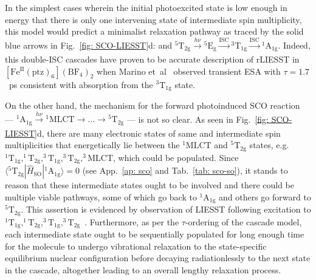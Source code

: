 In the simplest cases wherein the initial photoexcited state is low enough in energy that
there is only one intervening state of intermediate spin multiplicity,
this model would predict a minimalist relaxation pathway
as traced by the solid blue arrows in Fig.~\ref{fig: SCO-LIESST}d:
and $\mathrm{^5 T_{2g}} \xrightarrow[]{h \nu} \mathrm{^5 E_{g}} \xrightarrow[]{\text{ISC}} \mathrm{^3 T_{1g}}
\xrightarrow[]{\text{ISC}} \mathrm{^1 A_{1g}}$.
%
Indeed, this double-ISC cascades have proven to be accurate description of rLIESST
in $\mathrm{[Fe^{II}(ptz)_6](BF_4)_2}$ when Marino et~al~\cite{Marino2014}
observed transient ESA with $\tau = 1.7$~ps consistent
with absorption from the $\mathrm{^3 T_{1g}}$ state.

On the other hand, the mechanism for the forward photoinduced SCO reaction
--- $\mathrm{^1 A_{1g}} \xrightarrow[]{h \nu} \mathrm{^1 MLCT} \rightarrow \ldots
\rightarrow \mathrm{^5T_{2g}}$ --- is not so clear.
%
As seen in Fig.~\ref{fig: SCO-LIESST}d, there are many electronic states
of same and intermediate spin multiplicities
that energetically lie between the $\mathrm{^1MLCT}$ and $\mathrm{^5T_{2g}}$ states,
e.g.~$\mathrm{^1T_{1g}, ^1T_{2g}, ^3T_{1g}, ^3T_{2g}, ^3MLCT}$,
which could be populated.
%
Since $\langle \mathrm{^5T_{2g}} | \hat{H}_\text{SO} | \mathrm{^1A_{1g}} \rangle = 0 $
(see App.~\ref{ap: sco} and Tab.~\ref{tab: sco-so}),
it stands to reason that these intermediate states ought
to be involved and there could be multiple viable pathways, some
of which go back to $\mathrm{^1 A_{1g}}$ and others go forward to $\mathrm{^5T_{2g}}$.
This assertion is evidenced by observation of LIESST following excitation
to $\mathrm{^1T_{1g}, ^1T_{2g}, ^3T_{1g}, ^3T_{2g}}$~\cite{Hauser1991c}.
%
Furthermore, as per the $\tau$-ordering of the cascade model,
each intermediate state ought to be sequentially populated
for long enough time for the molecule to undergo vibrational relaxation to
the state-specific equilibrium nuclear configuration before decaying radiationlessly
to the next state in the cascade,
altogether leading to an overall lengthy relaxation process.

